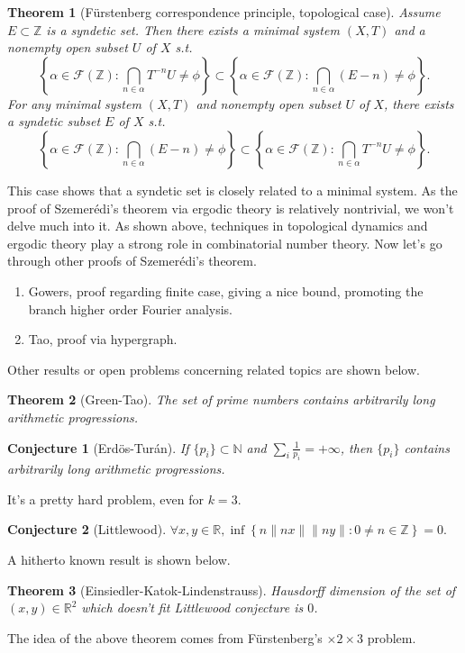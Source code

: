 \documentclass[12pt]{article}
\newtheorem{conjecture}{Conjecture}
\newtheorem{theorem}{Theorem}
\begin{document}
\begin{theorem}[F\"urstenberg correspondence principle, topological case]
Assume $E\subset\mathbb Z$ is a syndetic set. Then there exists a minimal system $(X,T)$ and a nonempty open subset $U$ of $X$ s.t. \[\left\{\alpha\in\mathscr F(\mathbb Z):\bigcap_{n\in \alpha}T^{-n}U \ne \phi \right\}\subset\left\{\alpha\in\mathscr F(\mathbb Z):\bigcap_{n\in\alpha}(E-n)\ne \phi \right\}. \]
For any minimal system $(X,T)$ and nonempty open subset $U$ of $X$, there exists a syndetic subset $E$ of $X$ s.t. \[ \left\{ \alpha\in\mathscr F(\mathbb Z):\bigcap_{n\in\alpha}(E-n)\ne \phi \right\}\subset \left\{\alpha\in\mathscr F(\mathbb Z):\bigcap_{n\in\alpha}T^{-n}U\ne \phi \right\}. \]
\end{theorem}
This case shows that a syndetic set is closely related to a minimal system. As the proof of Szemer\'edi's theorem via ergodic theory is relatively nontrivial, we won't delve much into it. As shown above, techniques in topological dynamics and ergodic theory play a strong role in combinatorial number theory. Now let's go through other proofs of Szemer\'edi's theorem.
\begin{enumerate}
\item Gowers, proof regarding finite case, giving a nice bound, promoting the branch higher order Fourier analysis.
\item Tao, proof via hypergraph.
\end{enumerate}
Other results or open problems concerning related topics are shown below.
\begin{theorem}[Green-Tao]
The set of prime numbers contains arbitrarily long arithmetic progressions.
\end{theorem}
\begin{conjecture}[Erd\"os-Tur\'an]
If $\{p_i\}\subset\mathbb N$ and $\sum\limits_i\frac{1}{p_i}=+\infty$, then $\{p_i\}$ contains arbitrarily long arithmetic progressions.
\end{conjecture}
It's a pretty hard problem, even for $k=3$.
\begin{conjecture}[Littlewood]
$\forall x,y\in\mathbb R,\inf\left\{n\|nx\|\|ny\|:0\ne n\in\mathbb Z \right\}=0.$
\end{conjecture}
A hitherto known result is shown below.
\begin{theorem}[Einsiedler-Katok-Lindenstrauss]
Hausdorff dimension of the set of $(x,y)\in \mathbb R^2$ which doesn't fit Littlewood conjecture is $0$.
\end{theorem}
The idea of the above theorem comes from F\"urstenberg's $\times2\times3 $ problem.
\end{document}
